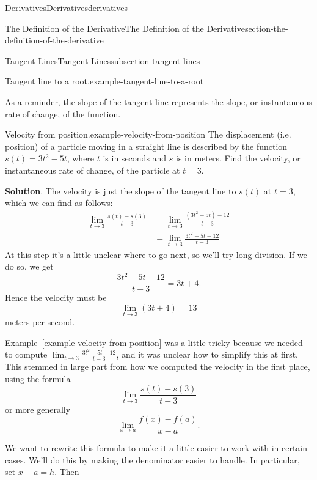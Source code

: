 \documentclass[oneside,10pt,]{book}
\numberwithin{equation}{section}
\begin{document}
\begin{chapterptx}{Derivatives}{}{Derivatives}{}{}{derivatives}
\begin{sectionptx}{The Definition of the Derivative}{}{The Definition of the Derivative}{}{}{section-the-definition-of-the-derivative}
\begin{subsectionptx}{Tangent Lines}{}{Tangent Lines}{}{}{subsection-tangent-lines}
\begin{example}{Tangent line to a root.}{example-tangent-line-to-a-root}
%
\end{example}
\hypertarget{p-82}{}%
As a reminder, the slope of the tangent line represents the slope, or instantaneous rate of change, of the function.%
\begin{example}{Velocity from position.}{example-velocity-from-position}%
\hypertarget{p-83}{}%
The displacement (i.e. position) of a particle moving in a straight line is described by the function \(s(t) = 3t^{2} - 5t\), where \(t\) is in seconds and \(s\) is in meters. Find the velocity, or instantaneous rate of change, of the particle at \(t=3\).%
\par\smallskip%
\noindent\textbf{Solution}.\hypertarget{solution-18}{}\quad%
\hypertarget{p-84}{}%
The velocity is just the slope of the tangent line to \(s(t)\) at \(t=3\), which we can find as follows:%
%
\begin{align*}
\lim_{t\to3}\frac{s(t) - s(3)}{t-3} & = \lim_{t\to3}\frac{(3t^{2} - 5t) - 12}{t-3} \\
& = \lim_{t\to3}\frac{3t^{2} - 5t - 12}{t-3} 
\end{align*}
\hypertarget{p-85}{}%
At this step it's a little unclear where to go next, so we'll try long division. If we do so, we get%
\begin{equation*}
\frac{3t^{2} - 5t - 12}{t-3} = 3t+4.
\end{equation*}
Hence the velocity must be%
\begin{equation*}
\lim_{t\to3}(3t+4) = 13
\end{equation*}
meters per second.%
\end{example}
\hypertarget{p-86}{}%
\hyperref[example-velocity-from-position]{Example~\ref{example-velocity-from-position}} was a little tricky because we needed to compute \(\lim_{t\to3}\frac{3t^{2}-5t-12}{t-3}\), and it was unclear how to simplify this at first. This stemmed in large part from how we computed the velocity in the first place, using the formula%
\begin{equation*}
\lim_{t\to3}\frac{s(t)-s(3)}{t-3}
\end{equation*}
or more generally%
\begin{equation*}
\lim_{x\to a}\frac{f(x) - f(a)}{x-a}\text{.}
\end{equation*}
%
\par
\hypertarget{p-87}{}%
We want to rewrite this formula to make it a little easier to work with in certain cases. We'll do this by making the denominator easier to handle. In particular, set \(x-a = h\). Then%
\begin{equation*}

\end{equation*}
\end{subsectionptx}
\end{sectionptx}
\end{chapterptx}
\end{document}
